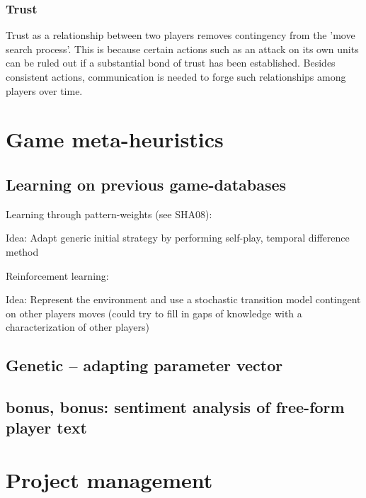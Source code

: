 \documentclass[12pt]{article}
\begin{document}
\subsubsection{Trust}

Trust as a relationship between two players removes contingency
from the 'move search process'. This is because certain actions such
as an attack on its own units can be ruled out if a substantial bond of trust
has been established. Besides consistent actions, communication
is needed to forge such relationships among players over time. 

\section{Game meta-heuristics}

\subsection{Learning on previous game-databases}

Learning through pattern-weights (see SHA08):

  Idea: Adapt generic initial strategy by performing 
        self-play, temporal difference method

Reinforcement learning:

  Idea: Represent the environment and use a stochastic
        transition model contingent on other players
        moves (could try to fill in gaps of knowledge 
        with a characterization of other players)

\subsection{Genetic -- adapting parameter vector}

\subsection{bonus, bonus: sentiment analysis of free-form player text}

%

\section{Project management}
\end{document}

